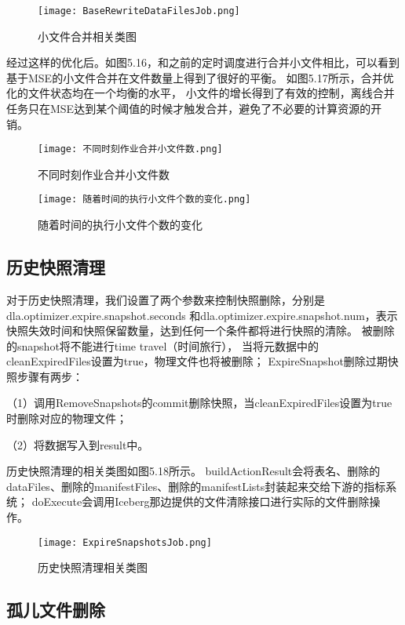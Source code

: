 \begin{figure}[h]
  \centering
  \texttt{[image: BaseRewriteDataFilesJob.png]}
  \caption{小文件合并相关类图}
  \label{fig:badge}
\end{figure}

经过这样的优化后。如图5.16，和之前的定时调度进行合并小文件相比，可以看到基于MSE的小文件合并在文件数量上得到了很好的平衡。
如图5.17所示，合并优化的文件状态均在一个均衡的水平，
小文件的增长得到了有效的控制，离线合并任务只在MSE达到某个阈值的时候才触发合并，避免了不必要的计算资源的开销。

\begin{figure}[h]
  \centering
  \texttt{[image: 不同时刻作业合并小文件数.png]}
  \caption{不同时刻作业合并小文件数}
  \label{fig:badge}
\end{figure}

\begin{figure}[h]
  \centering
  \texttt{[image: 随着时间的执行小文件个数的变化.png]}
  \caption{随着时间的执行小文件个数的变化}
  \label{fig:badge}
\end{figure}

\subsection{历史快照清理}

对于历史快照清理，我们设置了两个参数来控制快照删除，分别是dla.optimizer.expire.snapshot.seconds
和dla.optimizer.expire.snapshot.num，表示快照失效时间和快照保留数量，达到任何一个条件都将进行快照的清除。
被删除的snapshot将不能进⾏time travel（时间旅⾏），
当将元数据中的cleanExpiredFiles设置为true，物理⽂件也将被删除；
ExpireSnapshot删除过期快照步骤有两步：

（1）调⽤RemoveSnapshots的commit删除快照，当cleanExpiredFiles设置为true时删除对应的物理⽂件；

（2）将数据写⼊到result中。

历史快照清理的相关类图如图5.18所示。
buildActionResult会将表名、删除的dataFiles、删除的manifestFiles、删除的manifestLists封装起来交给下游的指标系统；
doExecute会调用Iceberg那边提供的文件清除接口进行实际的文件删除操作。

\begin{figure}[h]
  \centering
  \texttt{[image: ExpireSnapshotsJob.png]}
  \caption{历史快照清理相关类图}
  \label{fig:badge}
\end{figure}

\subsection{孤儿文件删除}

